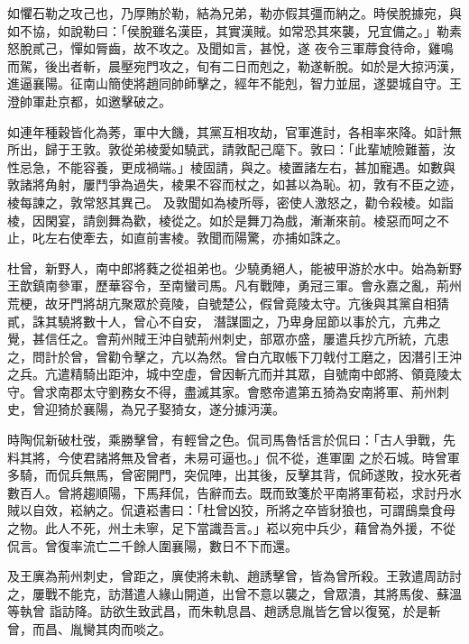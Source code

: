 \begin{pinyinscope}
 如懼石勒之攻己也，乃厚賄於勒，結為兄弟，勒亦假其彊而納之。時侯脫據宛，與如不協，如說勒曰：「侯脫雖名漢臣，其實漢賊。如常恐其來襲，兄宜備之。」勒素怒脫貳己，憚如脣齒，故不攻之。及聞如言，甚悅，遂
 夜令三軍蓐食待命，雞鳴而駕，後出者斬，晨壓宛門攻之，旬有二日而剋之，勒遂斬脫。如於是大掠沔漢，進逼襄陽。征南山簡使將趙同帥師擊之，經年不能剋，智力並屈，遂嬰城自守。王澄帥軍赴京都，如邀擊破之。



 如連年種穀皆化為莠，軍中大饑，其黨互相攻劫，官軍進討，各相率來降。如計無所出，歸于王敦。敦從弟棱愛如驍武，請敦配己麾下。敦曰：「此輩虓險難蓄，汝性忌急，不能容養，更成禍端。」棱固請，與之。棱置諸左右，甚加寵遇。如數與敦諸將角射，屢鬥爭為過失，棱果不容而杖之，如甚以為恥。初，敦有不臣之迹，棱每諫之，敦常怒其異己。
 及敦聞如為棱所辱，密使人激怒之，勸令殺棱。如詣棱，因閑宴，請劍舞為歡，棱從之。如於是舞刀為戲，漸漸來前。棱惡而呵之不止，叱左右使牽去，如直前害棱。敦聞而陽驚，亦捕如誅之。



 杜曾，新野人，南中郎將蕤之從祖弟也。少驍勇絕人，能被甲游於水中。始為新野王歆鎮南參軍，歷華容令，至南蠻司馬。凡有戰陣，勇冠三軍。會永嘉之亂，荊州荒梗，故牙門將胡亢聚眾於竟陵，自號楚公，假曾竟陵太守。亢後與其黨自相猜貳，誅其驍將數十人，曾心不自安，
 潛謀圖之，乃卑身屈節以事於亢，亢弗之覺，甚信任之。會荊州賊王沖自號荊州刺史，部眾亦盛，屢遣兵抄亢所統，亢患之，問計於曾，曾勸令擊之，亢以為然。曾白亢取帳下刀戟付工磨之，因潛引王沖之兵。亢遣精騎出距沖，城中空虛，曾因斬亢而并其眾，自號南中郎將、領竟陵太守。曾求南郡太守劉務女不得，盡滅其家。會愍帝遣第五猗為安南將軍、荊州刺史，曾迎猗於襄陽，為兄子娶猗女，遂分據沔漢。



 時陶侃新破杜弢，乘勝擊曾，有輕曾之色。侃司馬魯恬言於侃曰：「古人爭戰，先料其將，今使君諸將無及曾者，未易可逼也。」侃不從，進軍圍
 之於石城。時曾軍多騎，而侃兵無馬，曾密開門，突侃陣，出其後，反擊其背，侃師遂敗，投水死者數百人。曾將趨順陽，下馬拜侃，告辭而去。既而致箋於平南將軍荀崧，求討丹水賊以自效，崧納之。侃遺崧書曰：「杜曾凶狡，所將之卒皆豺狼也，可謂䲭梟食母之物。此人不死，州土未寧，足下當識吾言。」崧以宛中兵少，藉曾為外援，不從侃言。曾復率流亡二千餘人圍襄陽，數日不下而還。



 及王廙為荊州刺史，曾距之，廙使將未軌、趙誘擊曾，皆為曾所殺。王敦遣周訪討之，屢戰不能克，訪潛遣人緣山開道，出曾不意以襲之，曾眾潰，其將馬俊、蘇溫等執曾
 詣訪降。訪欲生致武昌，而朱軌息昌、趙誘息胤皆乞曾以復冤，於是斬曾，而昌、胤臠其肉而啖之。




\end{pinyinscope}

